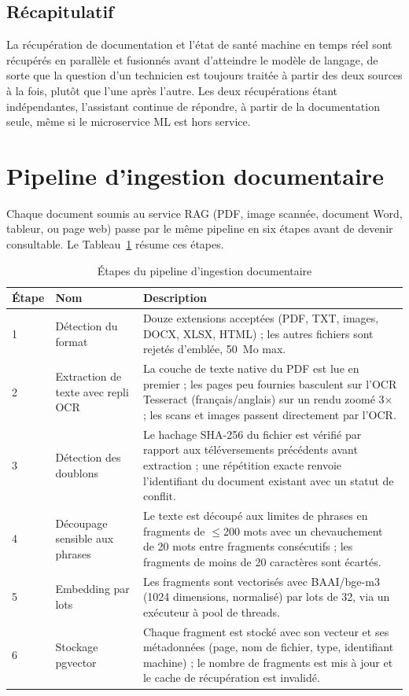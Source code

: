 \subsection{Récapitulatif}

La récupération de documentation et l'état de santé machine en temps réel sont récupérés en parallèle et fusionnés avant d'atteindre le modèle de langage, de sorte que la question d'un technicien est toujours traitée à partir des deux sources à la fois, plutôt que l'une après l'autre. Les deux récupérations étant indépendantes, l'assistant continue de répondre, à partir de la documentation seule, même si le microservice ML est hors service.

\section{Pipeline d'ingestion documentaire}

Chaque document soumis au service RAG (PDF, image scannée, document Word, tableur, ou page web) passe par le même pipeline en six étapes avant de devenir consultable. Le Tableau~\ref{tab:ingestion} résume ces étapes.

\begin{table}[H]
\centering
\begin{tabularx}{\textwidth}{|l|l|X|}
\hline
\textbf{Étape} & \textbf{Nom} & \textbf{Description} \\
\hline
1 & Détection du format & Douze extensions acceptées (PDF, TXT, images, DOCX, XLSX, HTML) ; les autres fichiers sont rejetés d'emblée, 50~Mo max. \\
\hline
2 & Extraction de texte avec repli OCR & La couche de texte native du PDF est lue en premier ; les pages peu fournies basculent sur l'OCR Tesseract (français/anglais) sur un rendu zoomé 3$\times$ ; les scans et images passent directement par l'OCR. \\
\hline
3 & Détection des doublons & Le hachage SHA-256 du fichier est vérifié par rapport aux téléversements précédents avant extraction ; une répétition exacte renvoie l'identifiant du document existant avec un statut de conflit. \\
\hline
4 & Découpage sensible aux phrases & Le texte est découpé aux limites de phrases en fragments de $\leq$200 mots avec un chevauchement de 20 mots entre fragments consécutifs ; les fragments de moins de 20 caractères sont écartés. \\
\hline
5 & Embedding par lots & Les fragments sont vectorisés avec BAAI/bge-m3 (1024 dimensions, normalisé) par lots de 32, via un exécuteur à pool de threads. \\
\hline
6 & Stockage pgvector & Chaque fragment est stocké avec son vecteur et ses métadonnées (page, nom de fichier, type, identifiant machine) ; le nombre de fragments est mis à jour et le cache de récupération est invalidé. \\
\hline
\end{tabularx}
\caption{Étapes du pipeline d'ingestion documentaire}
\label{tab:ingestion}
\end{table}

